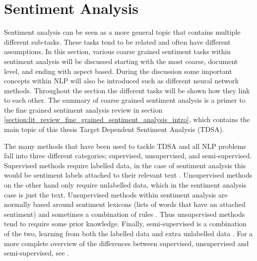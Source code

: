 \section{Sentiment Analysis}
Sentiment analysis can be seen as a more general topic that contains multiple different sub-tasks. These tasks tend to be related and often have different assumptions. In this section, various coarse grained sentiment tasks within sentiment analysis will be discussed starting with the most coarse, document level, and ending with aspect based. During the discussion some important concepts within NLP will also be introduced such as different neural network methods. Throughout the section the different tasks will be shown how they link to each other. The summary of coarse grained sentiment analysis is a primer to the fine grained sentiment analysis review in section \ref{section:lit_review_fine_grained_sentiment_analysis_intro}, which contains the main topic of this thesis Target Dependent Sentiment Analysis (TDSA).


The many methods that have been used to tackle TDSA and all NLP problems fall into three different categories; supervised, unsupervised, and semi-supervised. Supervised methods require labelled data, in the case of sentiment analysis this would be sentiment labels attached to their relevant text \citep{pang-etal-2002-thumbs}. Unsupervised methods on the other hand only require unlabelled data, which in the sentiment analysis case is just the text. Unsupervised methods within sentiment analysis are normally based around sentiment lexicons (lists of words that have an attached sentiment) \citep{hu2004mining} and sometimes a combination of rules \citep{Hutto2014VADERAP}. Thus unsupervised methods tend to require some prior knowledge. Finally, semi-supervised is a combination of the two, learning from both the labelled data and extra unlabelled data \citep{zhu2005semi}. For a more complete overview of the differences between supervised, unsupervised and semi-supervised, see \citet{Weston2007LargeScaleSL}.

